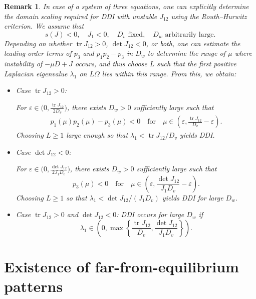 \documentclass[12pt, a4paper]{amsart}
\numberwithin{equation}{section}
\newcommand{\Ds}{D_v}
\newcommand{\Df}{D_w}
\DeclareMathOperator{\tr}{tr}
\newtheorem{remark}[theorem]{\bf Remark}
\begin{document}
\begin{remark}
In case of a system of three equations, one can explicitly determine the domain scaling required for DDI with unstable $J_{12}$ using the Routh--Hurwitz criterion.
We assume that
\[
s(J)<0,\quad J_1 < 0,\quad  \Ds \text{ fixed}, \quad \Df \text{ arbitrarily large}.
\]
Depending on whether $\tr J_{12} > 0$, $\det J_{12} < 0$, or both, one can estimate the leading-order terms of $p_3$ and $p_1p_2 - p_3$ in $\Df$ to determine the range of $\mu$ where instability of $-\mu D + J$ occurs, and thus choose $L$ such that the first positive Laplacian eigenvalue $\lambda_1$ on $L\Omega$ lies within this range.
From this, we obtain:
\begin{itemize}
    \item Case $\tr J_{12} > 0$:

    For $\varepsilon \in \big(0, \frac{\tr J_{12}}{2\Ds}\big)$, there exists $\Df > 0$ sufficiently large such that
    \begin{align}
        p_1(\mu)p_2(\mu) - p_3(\mu) < 0 \quad\text{for}\quad \mu \in \left(\varepsilon, \frac{\tr J_{12}}{\Ds} - \varepsilon\right).
    \end{align}
    Choosing $L \geqslant 1$ large enough so that $\lambda_1 < {\tr J_{12}}/{\Ds}$ 
    yields DDI.

    \item Case $\det J_{12} < 0$:

    For $\varepsilon \in \big(0, \frac{\det J_{12}}{2 J_1 \Ds}\big)$, there exists $\Df > 0$ sufficiently large such that
    \[
        p_3(\mu) < 0 \quad\text{for}\quad \mu \in \left(\varepsilon, \frac{\det J_{12}}{J_1 \Ds} - \varepsilon\right).
    \]
    Choosing $L \geqslant 1$ so that $\lambda_1 < {\det J_{12}}/({J_1 \Ds})$ yields DDI for large $\Df$.

    \item Case $\tr J_{12} > 0$ and $\det J_{12} < 0$:  
    DDI occurs for large $\Df$ if
    \[
        \lambda_1 \in \left(0, \max\left\{\frac{\tr J_{12}}{\Ds}, \frac{\det J_{12}}{J_1 \Ds}\right\}\right).
    \]
\end{itemize}
\end{remark}



\section{Existence of far-from-equilibrium patterns}
\label{sec:existence_jump}
\end{document}
